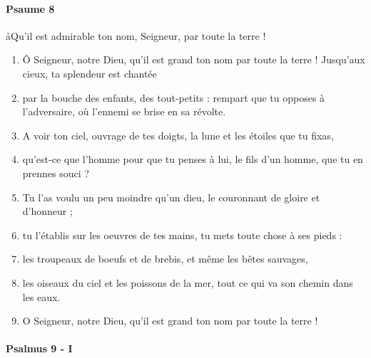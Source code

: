 \documentclass[twoside]{article}
\begin{document}
\begin{paracol}[1]{2}
\switchcolumn

\paragraph{Psaume 8}
\aa Qu'il est admirable ton nom, Seigneur, par toute la terre !


\begin{enumerate}[wide, itemsep=0mm, labelwidth=!, labelindent=0pt, label=\color{gregoriocolor}\theenumi]
\item Ô Seigneur, notre Dieu, qu'il est grand ton nom par toute la terre ! Jusqu'aux cieux, ta splendeur est chantée
\item par la bouche des enfants, des tout-petits : rempart que tu opposes à l'adversaire, où l'ennemi se brise en sa révolte.
\item A voir ton ciel, ouvrage de tes doigts, la lune et les étoiles que tu fixas,
\item qu'est-ce que l'homme pour que tu penses à lui, le fils d'un homme, que tu en prennes souci ?
\item Tu l'as voulu un peu moindre qu'un dieu, le couronnant de gloire et d'honneur ;
\item tu l'établis sur les oeuvres de tes mains, tu mets toute chose à ses pieds :
\item les troupeaux de boeufs et de brebis, et même les bêtes sauvages,
\item les oiseaux du ciel et les poissons de la mer, tout ce qui va son chemin dans les eaux.
\item O Seigneur, notre Dieu, qu'il est grand ton nom par toute la terre !
\end{enumerate}

\switchcolumn*

\paragraph{Psalmus 9 - I}



\end{paracol}
\end{document}
